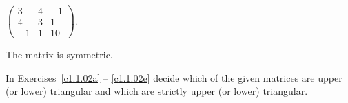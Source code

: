 \documentclass{ximera}
\begin{document}
\begin{exercise} \label{c1.1.01e}
 $\left( \begin{array}{rrr}
 3 & 4 & -1\\
 4 & 3 &  1\\
           -1 & 1 & 10\end{array} \right)$.
  \begin{multipleChoice}
  \end{multipleChoice}
       

\begin{solution}
The matrix is symmetric.

\end{solution}
\end{exercise}

\noindent In Exercises~\ref{c1.1.02a} -- \ref{c1.1.02e} decide which
of the given matrices are upper (or lower) triangular and which are
strictly upper (or lower) triangular.
\end{document}
